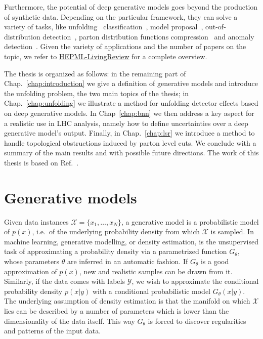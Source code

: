 Furthermore, the potential of deep generative models goes beyond the production of synthetic data. Depending on the particular framework, they can solve a variety of tasks, like unfolding~\cite{Andreassen:2019cjw, Datta:2018mwd,fcgan} classification~\cite{ardizzone2021training, mackowiak2020generative}, model proposal~\cite{2020ganEFT}, out-of-distribution detection~\cite{nalisnick2019deep, kirichenko2020normalizing, serra2020input, song2019unsupervised}, parton distribution functions compression~\cite{compressing_pdf} and anomaly detection~\cite{knapp2020adversarially, pol2020anomaly, cheng2021variational, newPhysAnom}. 
Given the variety of applications and the number of papers on the topic, we refer to \href{https://github.com/iml-wg/HEPML-LivingReview}{HEPML-LivingReview} for a complete overview.

The thesis is organized as follows:
in the remaining part of Chap.~\ref{chap:introduction} we give a definition of generative models and introduce the unfolding problem, the two main topics of the thesis; in Chap.~\ref{chap:unfolding} we illustrate a method for unfolding detector effects based on deep generative models. In Chap~\ref{chap:bnn} we then address a key aspect for a realistic use in LHC analysis, namely how to define uncertainties over a deep generative model's output. Finally, in Chap.~\ref{chap:lsr} we introduce a method to handle topological obstructions induced by parton level cuts. We conclude with a summary of the main results and with possible future directions.
The work of this thesis is based on Ref.~\cite{cond_gan, Bellagente:2020piv, Bellagente:2021yyh, LSR}.

\section{Generative models}\label{sec:gmm}
Given data instances $\mathcal{X} = \{ x_1, \ldots , x_N \}$, a generative model is a probabilistic model of $p(x)$, i.e.\ of the underlying probability density from which $\mathcal{X}$ is sampled. 
In machine learning, generative modelling, or density estimation, is the unsupervised task of approximating a probability density via a parametrized function $G_{\theta}$, whose parameters $\theta$ are inferred in an automatic fashion. If $G_{\theta}$ is a good approximation of $p(x)$, new and realistic samples can be drawn from it.
Similarly, if the data comes with labels $\mathcal{Y}$, we wish to approximate the conditional probability density $p(x | y)$ with a conditional probabilistic model $G_{\theta}(x | y)$.
The underlying assumption of density estimation is that the manifold on which $\mathcal{X}$ lies can be described by a number of parameters which is lower than the dimensionality of the data itself. This way $G_{\theta}$ 
is forced to discover regularities and patterns of the input data.

